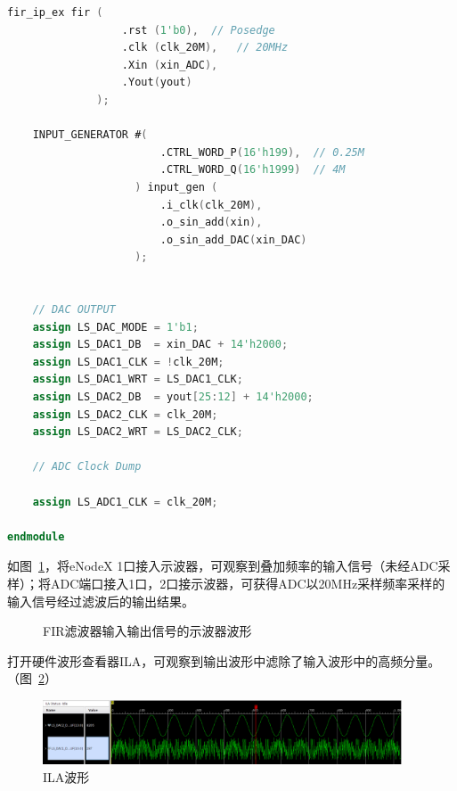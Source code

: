 \begin{lstlisting}[language=verilog,caption={顶层模块代码},label=lst:top_module]
    fir_ip_ex fir (
                  .rst (1'b0),  // Posedge
                  .clk (clk_20M),   // 20MHz
                  .Xin (xin_ADC),
                  .Yout(yout)
              );
    
    INPUT_GENERATOR #(
                        .CTRL_WORD_P(16'h199),  // 0.25M
                        .CTRL_WORD_Q(16'h1999)  // 4M
                    ) input_gen (
                        .i_clk(clk_20M),
                        .o_sin_add(xin),
                        .o_sin_add_DAC(xin_DAC)
                    );
    
    
    // DAC OUTPUT
    assign LS_DAC_MODE = 1'b1;
    assign LS_DAC1_DB  = xin_DAC + 14'h2000;
    assign LS_DAC1_CLK = !clk_20M;
    assign LS_DAC1_WRT = LS_DAC1_CLK;
    assign LS_DAC2_DB  = yout[25:12] + 14'h2000;
    assign LS_DAC2_CLK = clk_20M;
    assign LS_DAC2_WRT = LS_DAC2_CLK;
    
    // ADC Clock Dump
    
    assign LS_ADC1_CLK = clk_20M;
    
endmodule
\end{lstlisting}    

如图~\ref{fig:exp7:waveform}，将eNodeX 1口接入示波器，可观察到叠加频率的输入信号（未经ADC采样）；将ADC端口接入1口，2口接示波器，可获得ADC以20MHz采样频率采样的输入信号经过滤波后的输出结果。
\begin{figure}[htbp]
  \centering
    \hspace{0.05\textwidth}
  \caption{FIR滤波器输入输出信号的示波器波形}
  \label{fig:exp7:waveform}
\end{figure}

打开硬件波形查看器ILA，可观察到输出波形中滤除了输入波形中的高频分量。（图~\ref{fig:exp7:sim:ILA}）
\begin{figure}[htbp]
  \centering
  \includegraphics[width = 0.95\textwidth]{figure/exp7/ILA.png}
  \caption{ILA波形}
  \label{fig:exp7:sim:ILA}
\end{figure}

